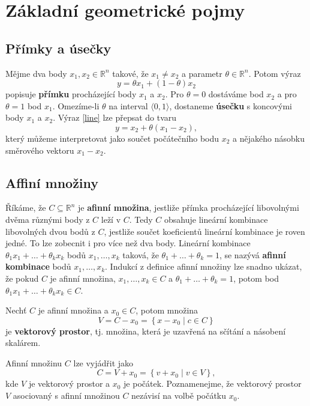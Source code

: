 \chapter{Základní geometrické pojmy}

\section{Přímky a úsečky}

Mějme dva body $x_1, x_2 \in \mathbb{R}^n$ takové, že $x_1 \neq x_2$ a parametr $\theta \in \mathbb{R}^n$. Potom výraz
\begin{equation}
    y = \theta x_1 + (1 - \theta) x_2
    \label{line}
\end{equation}
popisuje \textbf{přímku} procházející body $x_1$ a $x_2$. Pro $\theta = 0$ dostáváme bod $x_2$ a pro $\theta = 1$ bod $x_1$. Omezíme-li $\theta$ na interval $\langle 0, 1 \rangle$, dostaneme \textbf{úsečku} s koncovými body $x_1$ a $x_2$. Výraz \ref{line} lze přepsat do tvaru
$$
    y = x_2 + \theta (x_1 - x_2),
$$
který můžeme interpretovat jako součet počátečního bodu $x_2$ a nějakého násobku směrového vektoru $x_1 - x_2$.

\section{Affiní množiny}

Říkáme, že $C \subseteq \mathbb{R}^n$ je \textbf{afinní množina}, jestliže přímka procházející libovolnými dvěma různými body z $C$ leží v $C$. Tedy $C$ obsahuje lineární kombinace libovolných dvou bodů z $C$, jestliže součet koeficientů lineární kombinace je roven jedné. To lze zobecnit i pro více než dva body. Lineární kombinace $\theta_1 x_1 + \dots + \theta_k x_k$ bodů $x_1, \dots, x_k$ taková, že $\theta_1 + \dots + \theta_k = 1$, se nazývá \textbf{afinní kombinace} bodů $x_1, \dots, x_k$. Indukcí z definice afinní množiny lze snadno ukázat, že pokud $C$ je afinní množina, $x_1, \dots, x_k \in C$ a $\theta_1 + \dots + \theta_k = 1$, potom bod $\theta_1 x_1 + \dots + \theta_k x_k \in C$.

\noindent Nechť $C$ je afinní množina a $x_0 \in C$, potom množina
$$
    V = C - x_0 = \left\{ x - x_0 \mid c \in C \right\}
$$
je \textbf{vektorový prostor}, tj. množina, která je uzavřená na sčítání a násobení skalárem.

\noindent Afinní množinu $C$ lze vyjádřit jako
$$
    C = V + x_0 = \left\{ v + x_0 \mid v \in V \right\},
$$
kde $V$ je vektorový prostor a $x_0$ je počátek. Poznamenejme, že vektorový prostor $V$ asociovaný s afinní množinou $C$ nezávisí na volbě počátku $x_0$.

